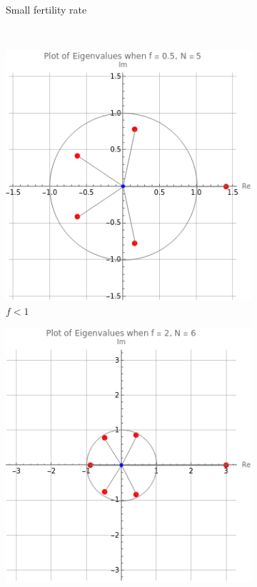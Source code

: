 \documentclass{article}
\numberwithin{equation}{section}
\begin{document}
\begin{figure}[htp]
\begin{subfigure}[b]{0.45\textwidth}
        \caption{Small fertility rate}
        \label{fig:fig2}
    \end{subfigure}
    \\
    \begin{subfigure}[b]{0.45\textwidth}
        \includegraphics[width=\textwidth]{fHfN5.png}
        \caption{$f < 1$}
        \label{fig:fig3}
    \end{subfigure}
    \hfill
    \begin{subfigure}[b]{0.45\textwidth}
        \includegraphics[width=\textwidth]{f2N6.png}

\end{subfigure}
\end{figure}
\end{document}
